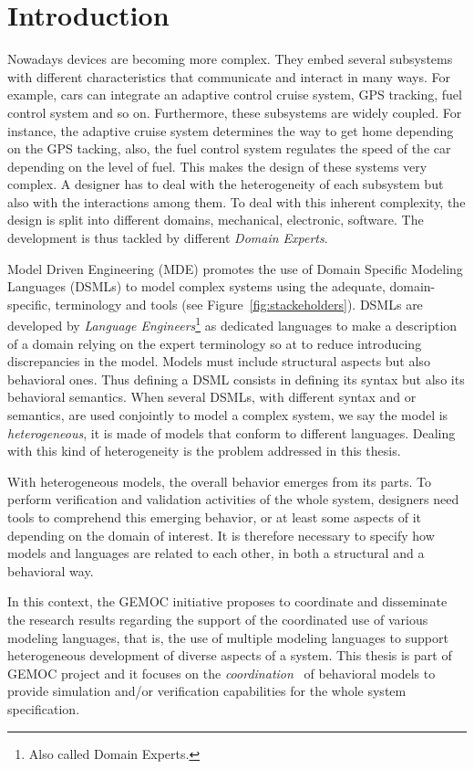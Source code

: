 \chapter{Introduction}	

Nowadays devices are becoming more complex. They embed several subsystems with different characteristics that communicate and interact in many ways. For example, cars can integrate an adaptive control cruise system, GPS tracking, fuel control system and so on. Furthermore, these subsystems are widely coupled. For instance, the adaptive cruise system determines the way to get home depending on the GPS tacking, also, the fuel control system regulates the speed of the car depending on the level of fuel. This makes the design of these systems very complex. A designer has to deal with the heterogeneity of each subsystem but also with the interactions among them. To deal with this inherent complexity, the design is split into different domains, \eg mechanical, electronic, software. The development is thus tackled by different \emph{Domain Experts}.

Model Driven Engineering (MDE) promotes the use of Domain Specific Modeling Languages (DSMLs) to model complex systems using the adequate, domain-specific, terminology and tools (see Figure~\ref{fig:stackeholders}). DSMLs are developed by \emph{Language Engineers}\footnote{Also called Domain Experts.} as dedicated languages to make a description of a domain relying on the expert terminology so at to reduce introducing discrepancies in the model. Models must include structural aspects but also behavioral ones. Thus defining a DSML consists in defining its syntax but also its behavioral semantics. When several DSMLs, with different syntax and or semantics, are used conjointly to model a complex system, we say the model is \emph{heterogeneous}, \ie it is made of models that conform to different languages. Dealing with this kind of heterogeneity is the problem addressed in this thesis. 

With heterogeneous models, the overall behavior emerges from its parts. To perform verification and validation activities of the whole system, designers need tools to comprehend this emerging behavior, 
or at least some aspects of it depending on the domain of interest. It is therefore necessary to specify how models and languages are related to each other, in both a structural and a behavioral way.

In this context, the GEMOC initiative proposes to coordinate and disseminate the research results regarding the support of the coordinated use of various modeling languages, that is, the use of multiple modeling languages to support heterogeneous development of diverse aspects of a system. This thesis is part of GEMOC project and it focuses on the \emph{coordination}~\cite{coordsignibib} of behavioral models to provide simulation and/or verification capabilities for the whole system specification. 


